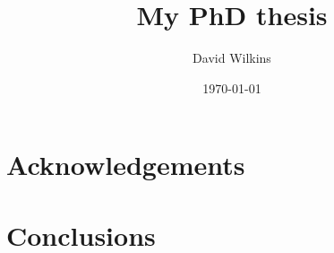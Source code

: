 \documentclass[a4paper]{report}
\begin{document}
\title{My PhD thesis}
\author{David Wilkins}
\date{\today}

\maketitle

\tableofcontents
\listoffigures
\listoftables

\chapter*{Acknowledgements}

\begin{abstract}
\end{abstract}








\chapter{Conclusions}
\label{ch:conc}



\end{document}
